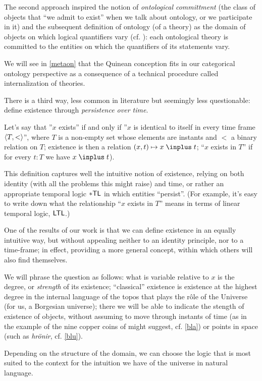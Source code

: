 The second approach inspired the notion of \emph{ontological committment} (the class of objects that ``we admit to exist'' when we talk about ontology, or we participate in it) and the subsequent definition of ontology (of a theory) as the domain of objects on which logical quantifiers vary (cf. \cite{Qui53}): each ontological theory is committed to the entities on which the quantifiers of its statements vary.

We will see in \autoref{metaon} that the Quinean conception fits in our categorical ontology perspective as a consequence of a technical procedure called internalization of theories.

There is a third way, less common in literature but seemingly less questionable: define existence through \emph{persistence over time}.

Let's say that ''$x$ exists'' if and only if ''$x$ is identical to itself in every time frame $\langle T, <\rangle$'', where $T$ is a non-empty set whose elements are instants and $<$ a binary relation on $T$; existence is then a relation $ (x, t) \mapsto x \mathrel \inplus t $; ``$ x $ exists in $ T $'' if for every $ t: T $ we have $ x \mathrel \inplus t $).

This definition captures well the intuitive notion of existence, relying  on both identity (with all the problems this might raise) and time, or rather an appropriate temporal logic $\sf *TL$ in which entities ``persist''. (For example, it's easy to write down what the relationship ``$x$ exists in $T$'' means in terms of linear temporal logic, $\sf LTL$.)

One of the results of our work is that we can define existence in an equally intuitive way, but  without appealing neither to an identity principle, nor to a time-frame; in effect, providing a more general concept, within which others will also find themselves.

We will phrase the question as follows: what is variable relative to $x$ is the degree, or \emph{strength} of its existence; ``classical'' existence is existence at the highest degree in the internal language of the topos that plays the r\^ole of the Universe (for us, a Borgesian universe); there we will be able to indicate the stength of existence of objects, without assuming to move through instants of time (as in the example of the nine copper coins of \cite{tlonEN} might suggest, cf. \autoref{bla}) or points in space (such as \emph{hr\"onir}, cf. \autoref{blu}).

Depending on the structure of the domain, we can choose the logic that is most suited to the context for the intuition we have of the universe in natural language.

